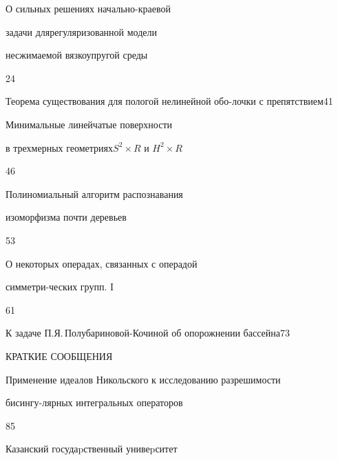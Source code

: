 

{О сильных решениях начально-краевой


задачи для\newline регуляризованной модели


несжимаемой вязкоупругой среды}{24}




{Теорема существования для пологой нелинейной обо-\newline лочки с препятствием}{41}




{Минимальные линейчатые  поверхности


в трехмерных геометриях\newline $S^2 \times R$ и $H^2 \times R$}{46}




{Полиномиальный алгоритм распознавания


изоморфизма почти деревьев}{53}




{О некоторых операдах, связанных с операдой 


симметри-\newline ческих групп. I}{61}




{К задаче П.Я.\,Полубариновой-Кочиной об опорожнении бассейна}{73}


\bigskip


\bigskip








\begin{center}


КРАТКИЕ СООБЩЕНИЯ


\end{center}


\bigskip







{Применение идеалов Никольского к исследованию разрешимости 


бисингу-\newline лярных интегральных операторов}{85}








\vfill


\noindent\raisebox{2pt}{\copyright} Казанский госудаpственный унивеpситет





